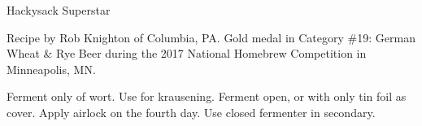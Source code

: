 \begin{recipe}{Hackysack Superstar}

\begin{aboutblock}
Recipe by Rob Knighton of Columbia, PA. Gold medal in Category \#19: German
Wheat \& Rye Beer during the 2017 National Homebrew Competition in Minneapolis,
MN. \sourceaha
\end{aboutblock}


\begin{methodandtiming}
 
\begin{mashsteps}
\end{mashsteps}

\begin{fermentationsteps}
\end{fermentationsteps}

\begin{directions}
Ferment only  of wort. Use  for krausening. Ferment open, or
with only tin foil as cover. Apply airlock on the fourth day. Use closed fermenter
in secondary.
\end{directions}

\end{methodandtiming}

\recipebreak

\begin{ingredientsblock}

\begin{malts}
\end{malts}

\begin{hops}
\end{hops}


\begin{twists}
\end{twists}

\end{ingredientsblock}

\end{recipe}

